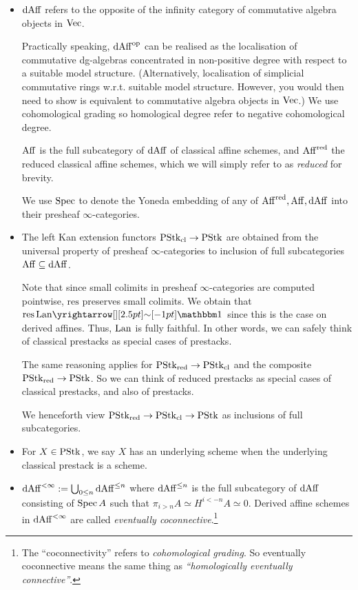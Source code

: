 \documentclass[./main.tex]{subfiles}
\begin{document}
\begin{itemize}

	\item $\mathrm{dAff}$ refers to the opposite of the infinity category
	of commutative algebra objects in $\mathrm{Vec}$.

	Practically speaking, $\mathrm{dAff}^{\mathrm{op}}$ can be realised as 
	the localisation of commutative dg-algebras concentrated in non-positive degree 
	with respect to a suitable model structure. 
  (Alternatively, localisation of simplicial commutative rings w.r.t. 
  suitable model structure. However, you would then need to show
  is equivalent to commutative algebra objects in $\mathrm{Vec}$.)
	We use cohomological grading so homological degree refer to 
	negative cohomological degree.

	$\mathrm{Aff}$ is the full subcategory of $\mathrm{dAff}$ of classical affine schemes,
	and $\mathrm{Aff}^{\mathrm{red}}$ the reduced classical affine schemes,
	which we will simply refer to as \emph{reduced} for brevity.

	We use $\mathrm{Spec}$ to denote the Yoneda embedding of
	any of $\mathrm{Aff}^{\mathrm{red}} , \mathrm{Aff} , \mathrm{dAff}$ into their presheaf $\infty$-categories.

	\item {}
	
	The left Kan extension functors $\mathrm{PStk}_{\mathrm{cl}} \to \mathrm{PStk}$
  are obtained from the 
	{universal property of presheaf $\infty$-categories}
	to inclusion of full subcategories $\mathrm{Aff} \subseteq \mathrm{dAff}$.

	Note that since small colimits in presheaf $\infty$-categories are computed
	pointwise, $\mathrm{res}$ preserves small colimits.
	We obtain that $\mathrm{res}\,\LAN \map{\sim}{} \id{}$
	since this is the case on derived affines.
	Thus, $\mathrm{Lan}$ is fully faithful.
	In other words, we can safely think of classical prestacks
	as special cases of prestacks.

	The same reasoning applies for $\mathrm{PStk}_{\mathrm{red}} \to \mathrm{PStk}_{\mathrm{cl}}$
	and the composite $\mathrm{PStk}_{\mathrm{red}} \to \mathrm{PStk}$.
	So we can think of reduced prestacks as special cases of
	classical prestacks, and also of prestacks.

	We henceforth view $\mathrm{PStk}_{\mathrm{red}} \to \mathrm{PStk}_{\mathrm{cl}} \to \mathrm{PStk}$
	as inclusions of full subcategories.

	\item For $X \in \mathrm{PStk}$, we say $X$ has an underlying scheme when
	the underlying classical prestack is a scheme.

	\item \cite[Ch 2, 1.2.3, 1.2.7]{GR1}
	$\mathrm{dAff}^{<\infty} := \bigcup_{0 \leq n} \mathrm{dAff}^{\leq n}$ where
  $\mathrm{dAff}^{\leq n}$ is the full subcategory of $\mathrm{dAff}$ consisting of
	$\mathrm{Spec}\,A$ such that $\pi_{i > n} A \simeq H^{i < -n} A \simeq 0$.
	Derived affine schemes in $\mathrm{dAff}^{<\infty}$ are called
	\emph{eventually coconnective}.\footnote{
		The ``coconnectivity'' refers to \emph{cohomological grading}.
		So eventually coconnective means the same thing as
		\emph{``homologically eventually connective''}.
	}


\end{itemize}
\end{document}
